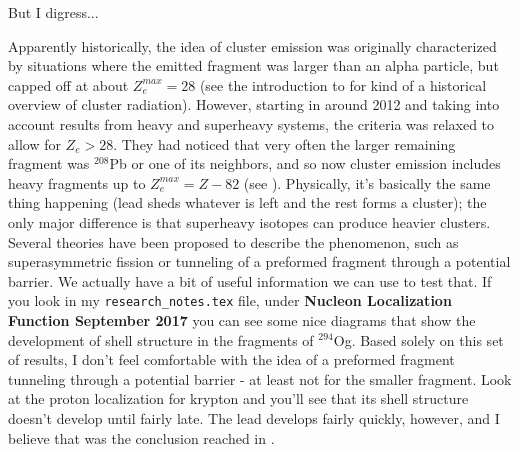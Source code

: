 But I digress...

Apparently historically, the idea of cluster emission was originally characterized by situations where the emitted fragment was larger than an alpha particle, but capped off at about $Z_e^{max}=28$ (see the introduction to \cite{Warda2011} for kind of a historical overview of cluster radiation). However, starting in around 2012 and taking into account results from heavy and superheavy systems, the criteria was relaxed to allow for $Z_e>28$. They had noticed that very often the larger remaining fragment was $^{208}$Pb or one of its neighbors, and so now cluster emission includes heavy fragments up to $Z_e^{max}=Z-82$ (see \cite{Poenaru2012}). Physically, it's basically the same thing happening (lead sheds whatever is left and the rest forms a cluster); the only major difference is that superheavy isotopes can produce heavier clusters. Several theories have been proposed to describe the phenomenon, such as superasymmetric fission or tunneling of a preformed fragment through a potential barrier. We actually have a bit of useful information we can use to test that. If you look in my \texttt{research\_notes.tex} file, under \textbf{Nucleon Localization Function  September 2017} you can see some nice diagrams that show the development of shell structure in the fragments of $^{294}$Og. Based solely on this set of results, I don't feel comfortable with the idea of a preformed fragment tunneling through a potential barrier - at least not for the smaller fragment. Look at the proton localization for krypton and you'll see that its shell structure doesn't develop until fairly late. The lead develops fairly quickly, however, and I believe that was the conclusion reached in \cite{Warda2011}.
